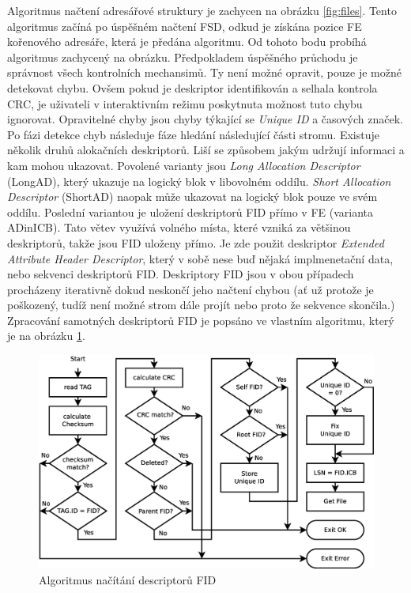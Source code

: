 Algoritmus načtení adresářové struktury je zachycen na obrázku \ref{fig:files}. Tento algoritmus začíná po úspěšném načtení FSD, odkud je získána pozice FE kořenového adresáře, která je předána algoritmu. Od tohoto bodu probíhá algoritmus zachycený na obrázku. Předpokladem úspěšného průchodu je správnost všech kontrolních mechansimů. Ty není možné opravit, pouze je možné detekovat chybu. Ovšem pokud je deskriptor identifikován a selhala kontrola CRC, je uživateli v interaktivním režimu poskytnuta možnost tuto chybu ignorovat. Opravitelné chyby jsou chyby týkající se \textit{Unique ID} a časových značek. Po fázi detekce chyb následuje fáze hledání následující části stromu. Existuje několik druhů alokačních deskriptorů. Liší se způsobem jakým udržují informaci a kam mohou ukazovat. Povolené varianty jsou \textit{Long Allocation Descriptor} (LongAD), který ukazuje na logický blok v libovolném oddílu. \textit{Short Allocation Descriptor} (ShortAD) naopak může ukazovat na logický blok pouze ve svém oddílu. Poslední variantou je uložení deskriptorů FID přímo v FE (varianta ADinICB). Tato větev využívá volného místa, které vzniká za většinou deskriptorů, takže jsou FID uloženy přímo. Je zde použit deskriptor \textit{Extended Attribute Header Descriptor}, který v sobě nese buď nějaká implmenetační data, nebo sekvenci deskriptorů FID. Deskriptory FID jsou v obou případech procházeny iterativně dokud neskončí jeho načtení chybou (ať už protože je poškozený, tudíž není možné strom dále projít nebo proto že sekvence skončila.) Zpracování samotných deskriptorů FID je popsáno ve vlastním algoritmu, který je na obrázku \ref{fig:fid}.\\
\begin{figure}[] 
    \centering
    \includegraphics[scale=0.36]{obrazky/inspect-fid.eps}
    \caption{Algoritmus načítání descriptorů FID}
    \label{fig:fid}
\end{figure}
